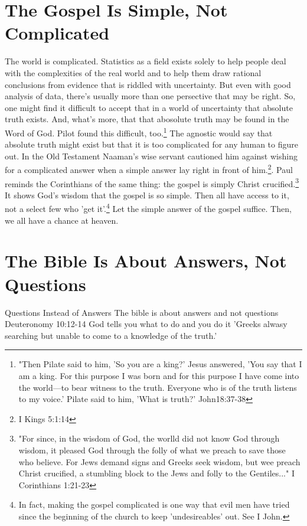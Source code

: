 \documentclass{tufte-handout}
\begin{document}
\section{The Gospel Is Simple, Not Complicated}\label{sec:invented-complexity}
The world is complicated.  Statistics as a field exists solely to help people deal with the complexities of the real world and to help them draw rational conclusions from evidence that is riddled with uncertainty. But even with good analysis of data, there's usually more than one persective that may be right.  So, one might find it difficult to accept that in a world of uncertainty that absolute truth exists.  And, what's more, that that abosolute truth may be found in the Word of God.  Pilot found this difficult, too.\footnote{"Then Pilate said to him, 'So you are a king?' Jesus answered, 'You say that I am a king. For this purpose I was born and for this purpose I have come into the world---to bear witness to the truth.  Everyone who is of the truth listens to my voice.' Pilate said to him, 'What is truth?' John18:37-38} The agnostic would say that absolute truth might exist but that it is too complicated for any human to figure out.  In the Old Testament Naaman's wise servant cautioned him against wishing for a complicated answer when a simple answer lay right in front of him.\footnote{I Kings 5:1:14}.  Paul reminds the Corinthians of the same thing: the gospel is simply Christ crucified.\footnote{"For since, in the wisdom of God, the worlld did not know God through wisdom, it pleased God through the folly of what we preach to save those who believe.  For Jews demand signs and Greeks seek wisdom, but wee preach Christ crucified, a stumbling block to the Jews and folly to the Gentiles..." I Corinthians 1:21-23} It shows God's wisdom that the gospel is so simple.  Then all have access to it, not a select few who 'get it'.\footnote{In fact, making the gospel complicated is one way that evil men have tried since the beginning of the church to keep 'undesireables' out.  See I John.} Let the simple answer of the gospel suffice. Then, we all have a chance at heaven.  

\section{The Bible Is About Answers, Not Questions}\label{sec:questions-instead-of-answers}
Questions Instead of Answers
The bible is about answers and not questions
Deuteronomy 10:12-14 God tells you what to do and you do it
'Greeks alwasy searching but unable to come to a knowledge of the truth.'
\end{document}
